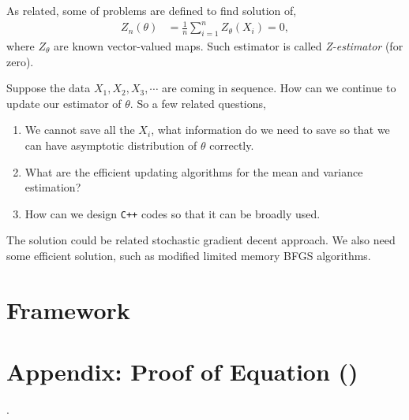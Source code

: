 \documentclass[12pt]{article}
\begin{document}
As related, some of problems are defined to find solution of,
\begin{align*}
Z_n(\theta) &= \frac{1}{n} \sum_{i=1}^n Z_{\theta}(X_i)=0,
\end{align*}
where $Z_{\theta}$ are known vector-valued maps.  Such estimator is called \emph{Z-estimator} (for zero). 

Suppose the data $X_1, X_2, X_3, \cdots$ are coming in sequence. How can we continue to update our estimator of $\theta$.  So a few related questions,
\begin{enumerate}
	\item We cannot save all the $X_i$, what information do we need to save so that we can have asymptotic distribution of $\theta$ correctly.
	\item What are the efficient updating algorithms for the mean and variance estimation?
	\item How can we design \texttt{C++} codes so that it can be broadly used.
\end{enumerate}

The solution could be related stochastic gradient decent approach. We also need some efficient solution, such as modified limited memory BFGS algorithms. 


\section{Framework}



\section*{Appendix: Proof of Equation ()}.






\end{document}
